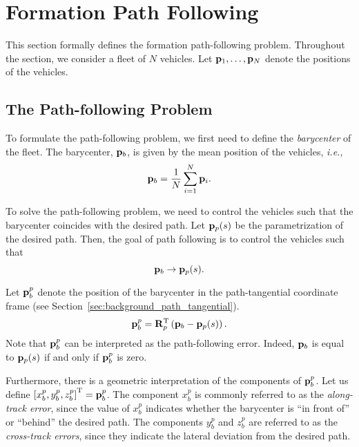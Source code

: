 \section{Formation Path Following}
\label{sec:background_formation_path_following}

This section formally defines the formation path-following problem.
Throughout the section, we consider a fleet of $N$ vehicles.
Let $\mathbf{p}_1, \ldots, \mathbf{p}_N$ denote the positions of the vehicles.

\subsection{The Path-following Problem}
To formulate the path-following problem, we first need to define the \emph{barycenter} of the fleet.
The barycenter, $\mathbf{p}_b$, is given by the mean position of the vehicles, \emph{i.e.,}
\begin{equation}
    \mathbf{p}_b = \frac{1}{N} \sum_{i=1}^N \mathbf{p}_i.
    \label{eq:background_p_b}
\end{equation}

To solve the path-following problem, we need to control the vehicles such that the barycenter coincides with the desired path.
Let $\mathbf{p}_p(s)$ be the parametrization of the desired path.
Then, the goal of path following is to control the vehicles such that
\begin{equation}
    \mathbf{p}_b \rightarrow \mathbf{p}_p(s).
\end{equation}

Let $\mathbf{p}_b^p$ denote the position of the barycenter in the path-tangential coordinate frame (see Section~\ref{sec:background_path_tangential}).
\begin{equation}
    \mathbf{p}_b^p = \mathbf{R}_p^{\mathrm{T}} \left(\mathbf{p}_b - \mathbf{p}_p(s)\right).
\end{equation}
Note that $\mathbf{p}_b^p$ can be interpreted as the path-following error.
Indeed, $\mathbf{p}_b$ is equal to $\mathbf{p}_p(s)$ if and only if $\mathbf{p}_b^p$ is zero.

Furthermore, there is a geometric interpretation of the components of $\mathbf{p}_b^p$.
Let us define $\left[x_b^p, y_b^p, z_b^p\right]^{\mathrm{T}} = \mathbf{p}_b^p$.
The component $x_b^p$ is commonly referred to as the \emph{along-track error}, since the value of $x_b^p$ indicates whether the barycenter is ``in front of'' or ``behind'' the desired path.
The components $y_b^p$ and $z_b^p$ are referred to as the \emph{cross-track errors}, since they indicate the lateral deviation from the desired path.

